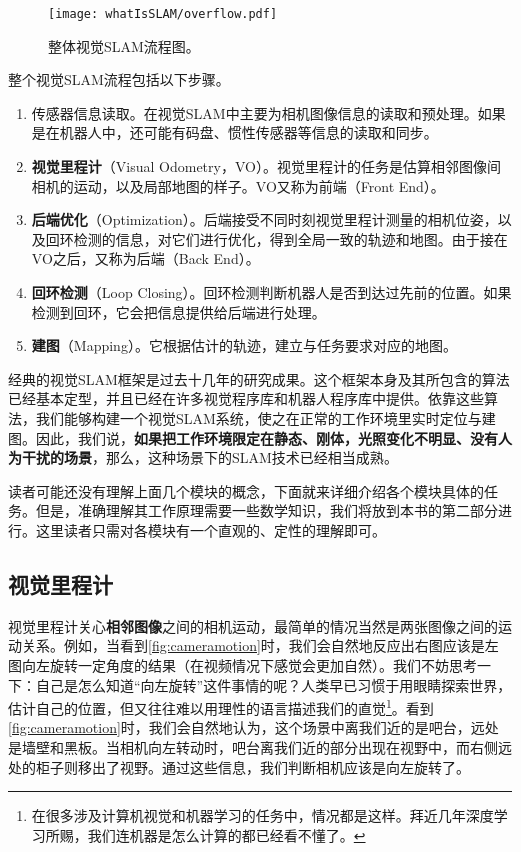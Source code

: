 \begin{figure}[!htp]
	\centering
	\texttt{[image: whatIsSLAM/overflow.pdf]}
	\caption{整体视觉SLAM流程图。}
	\label{fig:overflow}
\end{figure}

整个视觉SLAM流程包括以下步骤。
\begin{enumerate}
	\item 传感器信息读取。在视觉SLAM中主要为相机图像信息的读取和预处理。如果是在机器人中，还可能有码盘、惯性传感器等信息的读取和同步。
	\item \textbf{视觉里程计}（Visual Odometry，VO）。视觉里程计的任务是估算相邻图像间相机的运动，以及局部地图的样子。VO又称为前端（Front End）。
	\item \textbf{后端优化}（Optimization）。后端接受不同时刻视觉里程计测量的相机位姿，以及回环检测的信息，对它们进行优化，得到全局一致的轨迹和地图。由于接在VO之后，又称为后端（Back End）。
	\item \textbf{回环检测}（Loop Closing）。回环检测判断机器人是否到达过先前的位置。如果检测到回环，它会把信息提供给后端进行处理。
	\item \textbf{建图}（Mapping）。它根据估计的轨迹，建立与任务要求对应的地图。
\end{enumerate}

经典的视觉SLAM框架是过去十几年的研究成果。这个框架本身及其所包含的算法已经基本定型，并且已经在许多视觉程序库和机器人程序库中提供。依靠这些算法，我们能够构建一个视觉SLAM系统，使之在正常的工作环境里实时定位与建图。因此，我们说，\textbf{如果把工作环境限定在静态、刚体，光照变化不明显、没有人为干扰的场景}，那么，这种场景下的SLAM技术已经相当成熟\textsuperscript{\cite{Cadena2016}}。

读者可能还没有理解上面几个模块的概念，下面就来详细介绍各个模块具体的任务。但是，准确理解其工作原理需要一些数学知识，我们将放到本书的第二部分进行。这里读者只需对各模块有一个直观的、定性的理解即可。

\subsection{视觉里程计}
视觉里程计关心\textbf{相邻图像}之间的相机运动，最简单的情况当然是两张图像之间的运动关系。例如，当看到\autoref{fig:cameramotion}时，我们会自然地反应出右图应该是左图向左旋转一定角度的结果（在视频情况下感觉会更加自然）。我们不妨思考一下：自己是怎么知道“向左旋转”这件事情的呢？人类早已习惯于用眼睛探索世界，估计自己的位置，但又往往难以用理性的语言描述我们的直觉\footnote{在很多涉及计算机视觉和机器学习的任务中，情况都是这样。拜近几年深度学习所赐，我们连机器是怎么计算的都已经看不懂了。}。看到\autoref{fig:cameramotion}时，我们会自然地认为，这个场景中离我们近的是吧台，远处是墙壁和黑板。当相机向左转动时，吧台离我们近的部分出现在视野中，而右侧远处的柜子则移出了视野。通过这些信息，我们判断相机应该是向左旋转了。

